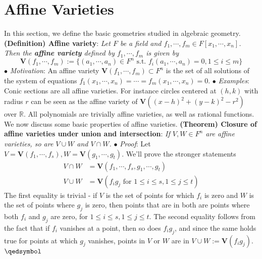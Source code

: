\documentclass{article}
\begin{document}
\section{Affine Varieties}

In this section, we define the basic geometries studied in algebraic geometry.
\newline \newline
\textbf{(Definition) Affine variety}: \textit{Let $ F $ be a field and $ f_1, \cdots, f_m \in F[x_1, \cdots, x_n] $. Then the \textbf{affine variety} defined by $ f_1, \cdots, f_m $ is given by}
$$ \mathbf{V}(f_1, \cdots, f_m) := \{ (a_1, \cdots, a_n) \in F^n \text{ s.t. } f_i(a_1, \cdots, a_n) = 0, 1 \leq i \leq m \} $$
\indent $ \bullet $ \textit{Motivation}: An affine variety $ \mathbf{V}(f_1, \cdots, f_m) \subset F^n $ is the set of all solutions of the system of equations $ f_1(x_1, \cdots, x_n) = \cdots = f_m(x_1, \cdots, x_n) = 0 $.
\indent $ \bullet $ \textit{Examples}: Conic sections are all affine varieties. For instance circles centered at $ (h, k) $ with radius $ r $ can be seen as the affine variety of $ \mathbf{V}\left( (x - h)^2 + (y - k)^2 - r^2 \right) $ over $ \mathbb{R} $. All polynomials are trivially affine varieties, as well as rational functions. 
\newline \newline
We now discuss some basic properties of affine varieties.
\textbf{(Theorem) Closure of affine varieties under union and intersection}: \textit{If $ V, W \in F^n $ are affine varieties, so are $ V \cup W $ and $ V \cap W $.}
\newline
\indent $ \bullet $ \textit{Proof}: Let $ V = \mathbf{V}(f_1, \cdots, f_s), W = \mathbf{V}(g_1, \cdots, g_t) $. We'll prove the stronger statements
$$ \begin{aligned}
	V \cap W &= \mathbf{V}(f_1, \cdots, f_s, g_1, \cdots, g_t) \\
	V\cup W &= \mathbf{V}(f_i g_j \text{ for } 1 \leq i \leq s, 1 \leq j \leq t)
\end{aligned} $$
The first equality is trivial - if $ V $ is the set of points for which $ f_i $ is zero and $ W $ is the set of points where $ g_j $ is zero, then points that are in both are points where both $ f_i $ and $ g_j $ are zero, for $ 1 \leq i \leq s, 1 \leq j \leq t $. The second equality follows from the fact that if $ f_i $ vanishes at a point, then so does $ f_i g_j $, and since the same holds true for points at which $ g_j $ vanishes, points in $ V $ or $ W $ are in $ V \cup W := \mathbf{V}(f_i g_j) $. $ \qedsymbol $
\end{document}
